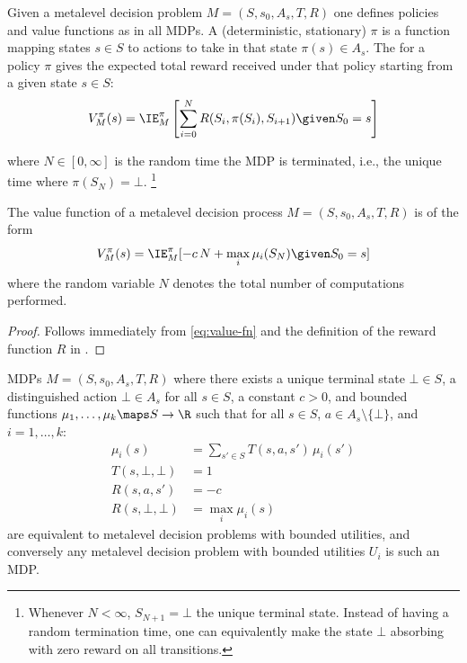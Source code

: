 Given a metalevel decision problem $M=(S,s_0,A_s,T,R)$ one defines policies and 
value functions as in all MDPs.  A (deterministic, stationary)  
$\pi$ is a function mapping states $s\in S$ to actions to take in that state $\pi(s)\in A_s$.
The  for a policy $\pi$ gives the expected total reward
received under that policy starting from a given state $s\in S$: 
\begin{equation}\label{eq:value-fn}
	V^\pi_M(s) = \IE^\pi_M\left[ \sum_{i=0}^N R(S_i,\pi(S_i),S_{i+1}) \given S_0 = s\right]	
\end{equation}

where $N\in[0,\infty]$ is the random time the MDP is terminated, i.e.,
the unique time where $\pi(S_N)=\bot$.%
\footnote{Whenever $N<\infty$, $S_{N+1}=\bot$ the unique terminal state.
Instead of having a random termination time, one can equivalently make
the state $\bot$ absorbing with zero reward on all transitions.}

\begin{thm}\label{thm:value-of-computation}
	The value function of a metalevel decision process $M=(S,s_0,A_s,T,R)$ is of the form
	\[
		V^\pi_M(s) = \IE^\pi_M[ -c\,N + \max_i \mu_i(S_N) \given S_0=s]
	\]
	where the random variable $N$ denotes the total number of computations performed.
\end{thm}

\begin{proof}
	Follows immediately from \eqref{eq:value-fn} and the definition of the
	reward function $R$ in .
\end{proof}

\begin{thm}
	MDPs $M=(S,s_0,A_s,T,R)$ where there exists a unique terminal state $\bot\in S$,
	a distinguished action $\bot\in A_s$ for all $s\in S$, a constant $c>0$, and bounded functions 
	$\mu_1,\dots,\mu_k\maps S\to\R$ such that for all $s\in S$, $a\in A_s\setminus\{\bot\}$, and $i=1,\dots,k$:
	\begin{align*}
		\mu_i(s) &= \sum_{s'\in S} T(s,a,s')\,\mu_i(s') \\
		T(s,\bot,\bot) &= 1 \\
		R(s,a,s') &= -c \\
		R(s,\bot,\bot) &= \max_i \mu_i(s)
	\end{align*}
	are equivalent to metalevel decision problems with bounded utilities, and conversely any 
	metalevel decision problem with bounded utilities $U_i$ is such an MDP.
\end{thm}

